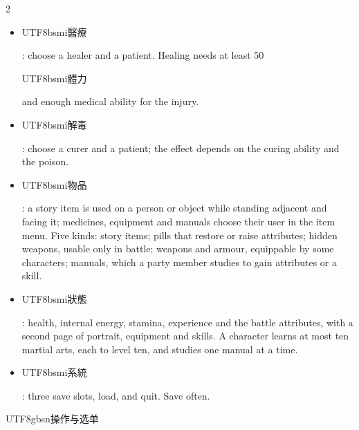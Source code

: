 \begin{paracol}{2}
\begin{itemize}[leftmargin=*,topsep=1pt,itemsep=0pt,parsep=0pt]\item \begin{CJK}{UTF8}{bsmi}醫療\end{CJK}: choose a healer and a patient. Healing needs at least 50 \begin{CJK}{UTF8}{bsmi}體力\end{CJK} and enough medical ability for the injury.\item \begin{CJK}{UTF8}{bsmi}解毒\end{CJK}: choose a curer and a patient; the effect depends on the curing ability and the poison.\item \begin{CJK}{UTF8}{bsmi}物品\end{CJK}: a story item is used on a person or object while standing adjacent and facing it; medicines, equipment and manuals choose their user in the item menu. Five kinds: story items; pills that restore or raise attributes; hidden weapons, usable only in battle; weapons and armour, equippable by some characters; manuals, which a party member studies to gain attributes or a skill.\item \begin{CJK}{UTF8}{bsmi}狀態\end{CJK}: health, internal energy, stamina, experience and the battle attributes, with a second page of portrait, equipment and skills. A character learns at most ten martial arts, each to level ten, and studies one manual at a time.\item \begin{CJK}{UTF8}{bsmi}系統\end{CJK}: three save slots, load, and quit. Save often.\end{itemize}
\switchcolumn
\footnotesize\setlength{\parskip}{2pt}
{\footnotesize\bfseries \begin{CJK}{UTF8}{gbsn}操作与选单\end{CJK}\par}

\end{paracol}
